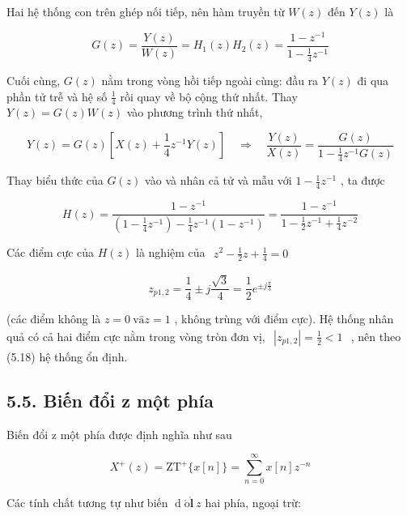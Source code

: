 \documentclass[
  10
]{article}
\begin{document}
Hai hệ thống con trên ghép nối tiếp, nên hàm truyền từ \(W ( z )\) đến
\(Y ( z )\) là

\[
G (z) = \frac {Y (z)}{W (z)} = H _ {1} (z) H _ {2} (z) = \frac {1 - z ^ {- 1}}{1 - \frac {1}{4} z ^ {- 1}}
\]

Cuối cùng, \(G ( z )\) nằm trong vòng hồi tiếp ngoài cùng: đầu ra
\(Y ( z )\) đi qua phần tử trễ và hệ số
\(\textstyle { \frac { 1 } { 4 } }\) rồi quay về bộ cộng thứ nhất. Thay
\(Y ( z ) = G ( z ) W ( z )\) vào phương trình thứ nhất,

\[
Y (z) = G (z) \left[ X (z) + \frac {1}{4} z ^ {- 1} Y (z) \right] \quad \Rightarrow \quad \frac {Y (z)}{X (z)} = \frac {G (z)}{1 - \frac {1}{4} z ^ {- 1} G (z)}
\]

Thay biểu thức của \(G ( z )\) vào và nhân cả tử và mẫu với
\(1 - \textstyle { \frac { 1 } { 4 } } z ^ { - 1 }\) , ta được

\[
H (z) = \frac {1 - z ^ {- 1}}{\left(1 - \frac {1}{4} z ^ {- 1}\right) - \frac {1}{4} z ^ {- 1} \left(1 - z ^ {- 1}\right)} = \frac {1 - z ^ {- 1}}{1 - \frac {1}{2} z ^ {- 1} + \frac {1}{4} z ^ {- 2}}
\]

Các điểm cực của \(H ( z )\) là nghiệm của
\(\begin{array} { r } { z ^ { 2 } - \frac { 1 } { 2 } z + \frac { 1 } { 4 } = 0 } \end{array}\)

\[
z _ {p 1, 2} = \frac {1}{4} \pm j \frac {\sqrt {3}}{4} = \frac {1}{2} e ^ {\pm j \frac {\pi}{3}}
\]

(các điểm không là \(z = 0 \mathrm { \ v { \hat { a } } } z = 1\) ,
không trùng với điểm cực). Hệ thống nhân quả có cả hai điểm cực nằm
trong vòng tròn đơn vị,
\(\begin{array} { r } { | z _ { p 1 , 2 } | = \frac { 1 } { 2 } < 1 } \end{array}\)
, nên theo (5.18) hệ thống ổn định. 

\subsection{5.5. Biến đổi z một
phía}\label{biux1ebfn-ux111ux1ed5i-z-mux1ed9t-phuxeda}

Biến đổi z một phía được định nghĩa như sau

\[
X ^ {+} (z) = \mathrm{ZT} ^ {+} \{x [ n ] \} = \sum_ {n = 0} ^ {\infty} x [ n ] z ^ {- n}
\]

Các tính chất tương tự như biến
\(\operatorname { d } \acute { \boldsymbol { \mathrm { o } } } \acute { \mathbf { l } } ~ z\)
hai phía, ngoại trừ:
\end{document}
